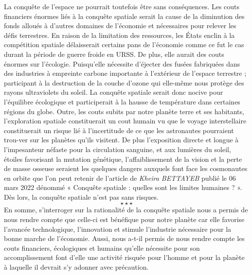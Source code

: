 \hspace*{0.5cm}La conquête de l’espace ne pourrait toutefois être sans conséquences. Les couts financiers énormes liés à la conquête spatiale serait la cause de la diminution des fonds alloués à d’autres domaines de l’économie et nécessaires pour relever les défis terrestres. En raison de la limitation des ressources, les États enclin à la compétition spatiale délaisserait certains pans de l’économie comme ce fut le cas durant la période de guerre froide en URSS. De plus, elle aurait des couts énormes sur l’écologie. Puisqu’elle nécessite d’éjecter des fusées fabriquées dans des industries à empreinte carbone importante à l’extérieur de l’espace terrestre ; participant à la destruction de la couche d’ozone qui elle-même nous protège des rayons ultraviolets du soleil. La conquête spatiale serait donc nocive pour l’équilibre écologique et participerait à la hausse de température dans certaines régions du globe. Outre, les couts subits par notre planète terre et ses habitants, l’exploration spatiale constituerait un cout humain vu que le voyage interstellaire constituerait un risque lié à l’incertitude de ce que les astronautes pourraient trou-ver sur les planètes qu’ils visitent. De plus l’exposition directe et longue à l’impesanteur néfaste pour la circulation sanguine, et aux lumières du soleil, étoiles favorisant la mutation génétique, l’affaiblissement de la vision et la perte de masse osseuse seraient les quelques dangers auxquels font face les cosmonautes en orbite que l’on peut retenir de l’article de \textit{Kheira BETTAYEB} publié le 06 mars 2022 dénommé « Conquête spatiale : quelles sont les limites humaines ? ».\\
\hspace*{0.5cm}Dès lors, la conquête spatiale n’est pas sans risques.
$$\star \star \star$$
\hspace*{0.5cm}En somme, s’interroger sur la rationalité de la conquête spatiale nous a permis de nous rendre compte que celle-ci est bénéfique pour notre planète car elle favorise l’avancée technologique, l’innovation et stimule l’industrie nécessaire pour la bonne marche de l’économie. Aussi, nous a-t-il permis de nous rendre compte les couts financiers, écologiques et humains qu’elle nécessite pour son accomplissement font d’elle une activité risquée pour l’homme et pour la planète à laquelle il devrait s’y adonner avec précaution.\newpage